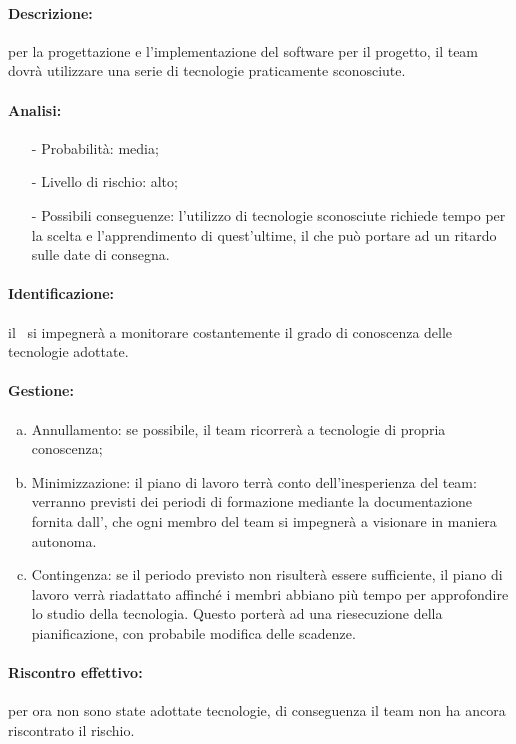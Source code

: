 \documentclass[../PianoProgetto.tex]{subfiles}
\begin{document}
	\paragraph*{Descrizione:} per la progettazione e l’implementazione del software per il progetto, il team dovrà utilizzare una serie di tecnologie praticamente sconosciute.
	
	\paragraph*{Analisi:}
	\begin{itemize}
		\item[-] Probabilità: media;
		\item[-] Livello di rischio: alto;
		\item[-] Possibili conseguenze: l’utilizzo di tecnologie sconosciute richiede tempo per la scelta e l’apprendimento di quest’ultime, il che può portare ad un ritardo sulle date di consegna.
	\end{itemize}
	
	\paragraph*{Identificazione:} il \responsabilediprogetto\ si impegnerà a monitorare costantemente il grado di conoscenza delle tecnologie adottate.
	
	\paragraph*{Gestione:}
	\begin{enumerate}[(a)]
		\item Annullamento: se possibile, il team ricorrerà a tecnologie di propria conoscenza;
		\item Minimizzazione: il piano di lavoro terrà conto dell’inesperienza del team: verranno previsti dei periodi di formazione mediante la documentazione fornita dall’\amministratore, che ogni membro del team si impegnerà a visionare in maniera autonoma.
		\item Contingenza: se il periodo previsto non risulterà essere sufficiente, il piano di lavoro verrà riadattato affinché i membri abbiano più tempo per approfondire lo studio della tecnologia. Questo porterà ad una riesecuzione della pianificazione, con probabile modifica delle scadenze.
	\end{enumerate} 
	
	\paragraph*{Riscontro effettivo:} per ora non sono state adottate tecnologie, di conseguenza il team non ha ancora riscontrato il rischio.
\end{document}
